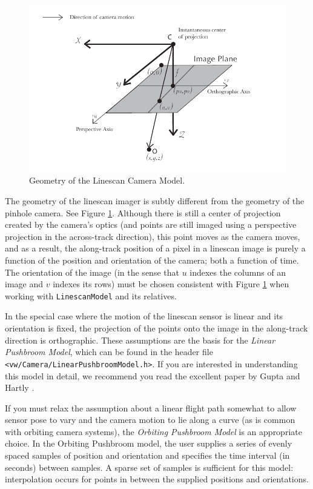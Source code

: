 \begin{figure}[tbp]
\begin{center}
  \includegraphics[width=6in]{images/linescan_geometry.pdf}
 \end{center}
  \caption{Geometry of the Linescan Camera Model.}
  \label{fig:linescan-geometry}
\end{figure}

The geometry of the linescan imager is subtly different from the
geometry of the pinhole camera.  See Figure
\ref{fig:linescan-geometry}.  Although there is still a center of
projection created by the camera's optics (and points are still imaged
using a perspective projection in the across-track direction), this
point moves as the camera moves, and as a result, the along-track
position of a pixel in a linescan image is purely a function of the
position and orientation of the camera; both a function of time.  The
orientation of the image (in the sense that $u$ indexes the columns of
an image and $v$ indexes its rows) must be chosen consistent with
Figure \ref{fig:linescan-geometry} when working with
\verb#LinescanModel# and its relatives.

In the special case where the motion of the linescan sensor is linear
and its orientation is fixed, the projection of the points onto the
image in the along-track direction is orthographic.  These assumptions
are the basis for the {\em Linear Pushbroom Model}, which can be found
in the header file \verb#<vw/Camera/LinearPushbroomModel.h>#.  If you
are interested in understanding this model in detail, we recommend you
read the excellent paper by Gupta and Hartly \cite{gupta97}.

If you must relax the assumption about a linear flight path somewhat
to allow sensor pose to vary and the camera motion to lie along a
curve (as is common with orbiting camera systems), the {\em Orbiting
  Pushbroom Model} is an appropriate choice.  In the Orbiting
Pushbroom model, the user supplies a series of evenly spaced samples
of position and orientation and specifies the time interval (in
seconds) between samples.  A sparse set of samples is sufficient for
this model: interpolation occurs for points in between the supplied
positions and orientations.

